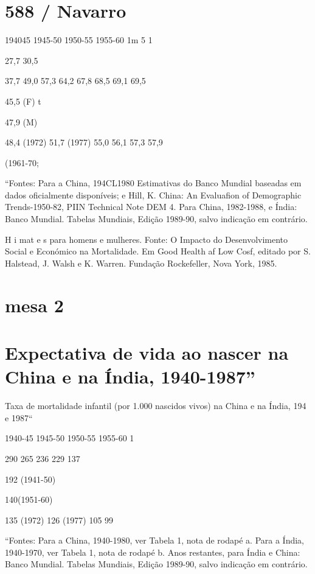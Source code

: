 {{\section{588 / Navarro}
 \par 
194045 1945-50 1950-55 1955-60 1m {\color{blue}5} 1%
 \par 
27,7 30,5
 \par 
37,7 49,0 57,3 64,2 67,8 68,5 69,1 69,5
 \par 
45,5 (F) t
 \par 
47,9 (M)
 \par 
48,4 (1972) 51,7 (1977) 55,0 56,1 57,3 57,9
 \par 
(1961-70;
 \par 
“Fontes: Para a China, 194CL1980 Estimativas do Banco Mundial baseadas em dados oficialmente disponíveis; e Hill, K. China: An Evaluafion of Demographic Trends-1950-82, PIIN Technical Note DEM {\color{blue}4}. Para China, 1982-1988, e Índia: Banco Mundial. Tabelas Mundiais, Edição 1989-90, salvo indicação em contrário.
 \par 
H i mat e s para homens e mulheres. Fonte: O Impacto do Desenvolvimento Social e Económico na Mortalidade. Em Good Health af Low Cosf, editado por S. Halstead, J. Walsh e K. Warren. Fundação Rockefeller, Nova York, 1985.
 \par 
\section{mesa 2}
 \par 
\section{Expectativa de vida ao nascer na China e na Índia, 1940-1987”}
 \par 
Taxa de mortalidade infantil (por {\color{blue}1}.{\color{blue}000} nascidos vivos) na China e na Índia, {\color{blue}194} e 1987“
 \par 
1940-45 1945-50 1950-55 1955-60 1%
 \par 
290 {\color{blue}265} 236 {\color{blue}229} 137%
 \par 
192 (1941-50)
 \par 
140(1951-60)
 \par 
135 (1972) {\color{blue}126} (1977) {\color{blue}105} {\color{blue}99}
 \par 
“Fontes: Para a China, 1940-1980, ver Tabela 1, nota de rodapé a. Para a Índia, 1940-1970, ver Tabela 1, nota de rodapé b. Anos restantes, para Índia e China: Banco Mundial. Tabelas Mundiais, Edição 1989-90, salvo indicação em contrário.
 \par 
}}
